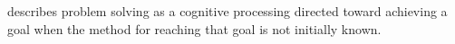 \documentclass[a4paper]{standalone}
\title{}
\begin{document}
   \maketitle

                  \cite{mayer-2013-problem-solving} describes problem solving as a cognitive processing directed toward achieving a goal when the method for reaching that goal is not initially known.
\end{document}
